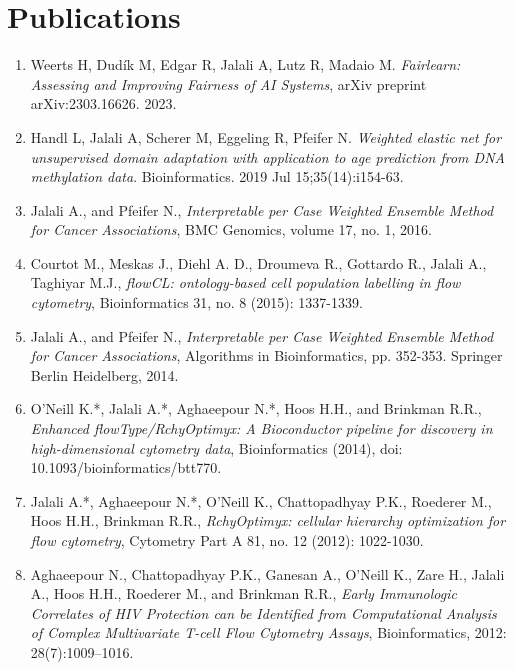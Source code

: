 \documentclass[11pt,a4paper,sans]{moderncv} %
\begin{document}
\renewcommand{\listitemsymbol}{-~} %


\section{Publications}

\begin{enumerate}
\item Weerts H, Dudík M, Edgar R, Jalali A, Lutz R, Madaio M. \emph{Fairlearn: Assessing and Improving Fairness of AI Systems}, arXiv preprint arXiv:2303.16626. 2023.

\item Handl L, Jalali A, Scherer M, Eggeling R, Pfeifer N. \emph{Weighted elastic net for unsupervised domain adaptation with application to age prediction from DNA methylation data}. Bioinformatics. 2019 Jul 15;35(14):i154-63.
  
\item Jalali A., and Pfeifer N., \emph{Interpretable per Case Weighted Ensemble Method for Cancer Associations}, BMC Genomics, volume 17, no. 1, 2016.

\item Courtot M., Meskas J., Diehl A. D., Droumeva R., Gottardo R., Jalali A., Taghiyar M.J., \emph{flowCL: ontology-based cell population labelling in flow cytometry}, Bioinformatics 31, no. 8 (2015): 1337-1339.

\item Jalali A., and Pfeifer N., \emph{Interpretable per Case Weighted Ensemble Method for Cancer Associations}, Algorithms in Bioinformatics, pp. 352-353. Springer Berlin Heidelberg, 2014.

\item O'Neill K.*, Jalali A.*, Aghaeepour N.*, Hoos H.H., and Brinkman R.R., \emph{Enhanced flowType/RchyOptimyx: A Bioconductor pipeline for discovery in high-dimensional cytometry data}, Bioinformatics (2014), doi: 10.1093/bioinformatics/btt770.

\item Jalali A.*, Aghaeepour N.*, O'Neill K., Chattopadhyay P.K., Roederer M., Hoos H.H., Brinkman R.R., \emph{RchyOptimyx: cellular hierarchy optimization for flow cytometry}, Cytometry Part A 81, no. 12 (2012): 1022-1030.

\item Aghaeepour N., Chattopadhyay P.K., Ganesan A., O'Neill K., Zare H., Jalali A., Hoos H.H., Roederer M., and Brinkman R.R., \emph{Early Immunologic Correlates of HIV Protection can be Identiﬁed from Computational Analysis of Complex Multivariate T-cell Flow Cytometry Assays},
Bioinformatics, 2012: 28(7):1009–1016.


\end{enumerate}
\end{document}
